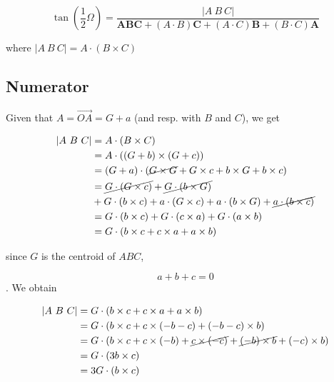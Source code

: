 \documentclass[10pt,a4paper]{article}
\begin{document}
$$
{\displaystyle \tan \left({\frac {1}{2}}\Omega \right)
  = {\frac {\left|{A}\ {B}\ {C}\right|}
    {\mathbf{A}\mathbf{B}\mathbf{C} + \left({A}\cdot {B}\right)\mathbf{C}
      + \left({A}\cdot {C}\right)\mathbf{B}
      + \left({B}\cdot {C}\right)\mathbf{A}}}}
$$

where $ \left|{A}\ {B}\ {C}\right|={A}\cdot ({B}\times {C}) $


\subsection{Numerator}


Given that $A = \vec{OA} = G + a$ (and resp.
with $B$ and $C$), we get


\begin{align*}
\left|{A}\ {B}\ {C}\right|
	& =  {A} \cdot ({B}\times {C}) \\
	& =  {A} \cdot ({(G + b)} \times {(G + c)}) \\
	& =  {(G + a)} \cdot (\cancel{G \times G}
	                      + G \times c
	                      + b \times G
	                      + b \times c) \\
	& = \cancel{G \cdot (G \times c)}
	                      + \cancel{G \cdot (b \times G)}\\
         & + G \cdot (b \times c)
	  + a \cdot (G \times c)
	  + a \cdot (b \times G)
	  + \cancel{a \cdot (b \times c)} \\
	& = G \cdot (b \times c)
	+ G \cdot (c \times a)
	+ G \cdot (a \times b) \\
	& = G \cdot \left(b \times c
	+c \times a
	+ a \times b \right)
\end{align*}

since $G$ is the centroid of $ABC$, 

\begin{equation}
a + b + c= 0
\label{eq1}
\end{equation}. We obtain

\begin{align}
\left|{A}\ {B}\ {C}\right|
& = G \cdot \left(b \times c
	+c \times a
	+ a \times b \right) \nonumber \\
& = G \cdot \left(b \times c
	+c \times (-b - c)
	+ (-b - c) \times b \right) \nonumber \\
& = G \cdot \left(b \times c
	+c \times (-b) + \cancel{c \times (- c)}
	+ \cancel{(-b) \times b} + (- c) \times b \right) \nonumber \\
& = G \cdot \left(3 b \times c \right) \nonumber \\
& = 3 G \cdot \left( b \times c \right)
\end{align}
\end{document}
